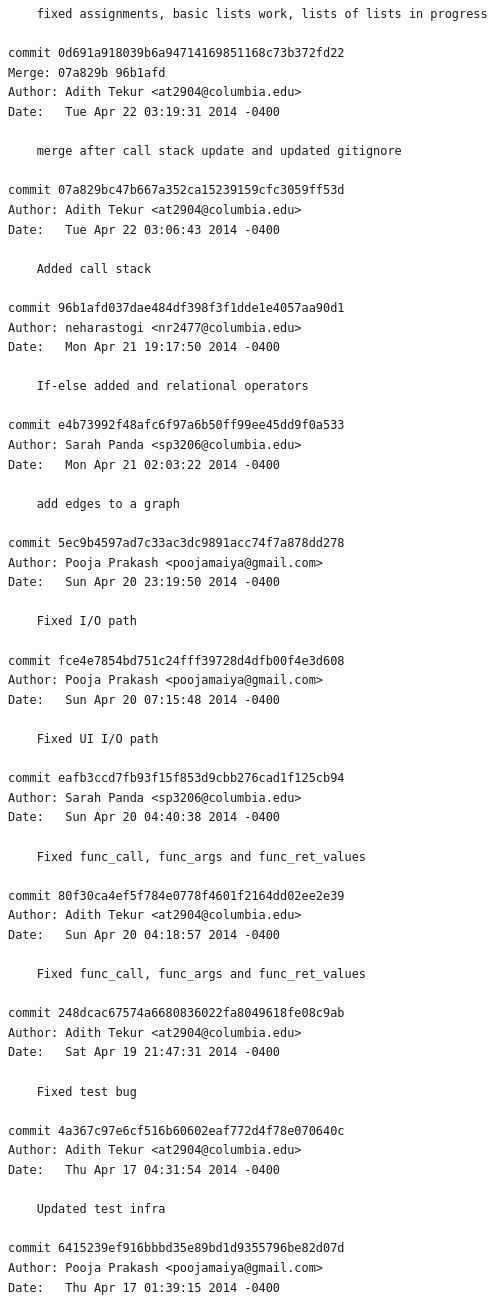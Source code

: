 \documentclass[a4paper]{article}
\begin{document}
\begin{verbatim}
    fixed assignments, basic lists work, lists of lists in progress

commit 0d691a918039b6a94714169851168c73b372fd22
Merge: 07a829b 96b1afd
Author: Adith Tekur <at2904@columbia.edu>
Date:   Tue Apr 22 03:19:31 2014 -0400

    merge after call stack update and updated gitignore

commit 07a829bc47b667a352ca15239159cfc3059ff53d
Author: Adith Tekur <at2904@columbia.edu>
Date:   Tue Apr 22 03:06:43 2014 -0400

    Added call stack

commit 96b1afd037dae484df398f3f1dde1e4057aa90d1
Author: neharastogi <nr2477@columbia.edu>
Date:   Mon Apr 21 19:17:50 2014 -0400

    If-else added and relational operators

commit e4b73992f48afc6f97a6b50ff99ee45dd9f0a533
Author: Sarah Panda <sp3206@columbia.edu>
Date:   Mon Apr 21 02:03:22 2014 -0400

    add edges to a graph

commit 5ec9b4597ad7c33ac3dc9891acc74f7a878dd278
Author: Pooja Prakash <poojamaiya@gmail.com>
Date:   Sun Apr 20 23:19:50 2014 -0400

    Fixed I/O path

commit fce4e7854bd751c24fff39728d4dfb00f4e3d608
Author: Pooja Prakash <poojamaiya@gmail.com>
Date:   Sun Apr 20 07:15:48 2014 -0400

    Fixed UI I/O path

commit eafb3ccd7fb93f15f853d9cbb276cad1f125cb94
Author: Sarah Panda <sp3206@columbia.edu>
Date:   Sun Apr 20 04:40:38 2014 -0400

    Fixed func_call, func_args and func_ret_values

commit 80f30ca4ef5f784e0778f4601f2164dd02ee2e39
Author: Adith Tekur <at2904@columbia.edu>
Date:   Sun Apr 20 04:18:57 2014 -0400

    Fixed func_call, func_args and func_ret_values

commit 248dcac67574a6680836022fa8049618fe08c9ab
Author: Adith Tekur <at2904@columbia.edu>
Date:   Sat Apr 19 21:47:31 2014 -0400

    Fixed test bug

commit 4a367c97e6cf516b60602eaf772d4f78e070640c
Author: Adith Tekur <at2904@columbia.edu>
Date:   Thu Apr 17 04:31:54 2014 -0400

    Updated test infra

commit 6415239ef916bbbd35e89bd1d9355796be82d07d
Author: Pooja Prakash <poojamaiya@gmail.com>
Date:   Thu Apr 17 01:39:15 2014 -0400


\end{verbatim}
\end{document}
